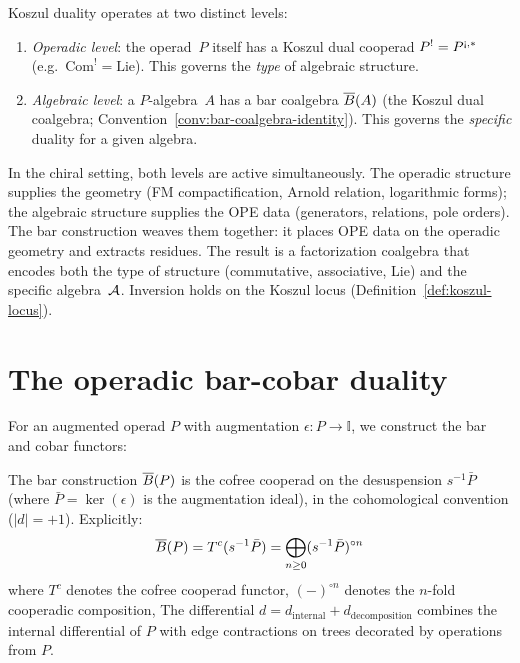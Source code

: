 \begin{remark}
\label{rem:operadic-vs-algebraic-kd}
Koszul duality operates at two distinct levels:
\begin{enumerate}[label=\textup{(\alph*)}]
\item \emph{Operadic level}: the operad~$P$ itself has a Koszul
  dual cooperad $P^! = P^{{\text{\textexclamdown}},*}$
  (e.g.\ $\mathrm{Com}^! = \mathrm{Lie}$).  This governs the
  \emph{type} of algebraic structure.
\item \emph{Algebraic level}: a $P$-algebra~$A$ has a bar
  coalgebra $\overline{B}(A)$ (the Koszul dual coalgebra;
  Convention~\ref{conv:bar-coalgebra-identity}).  This governs the
  \emph{specific} duality for a given algebra.
\end{enumerate}
In the chiral setting, both levels are active simultaneously.
The operadic structure supplies the geometry
(FM compactification, Arnold relation, logarithmic forms);
the algebraic structure supplies the OPE data (generators,
relations, pole orders).  The bar construction weaves them
together: it places OPE data on the operadic geometry and
extracts residues.  The result is a factorization coalgebra
that encodes both the type of structure (commutative,
associative, Lie) and the specific algebra~$\mathcal{A}$.
Inversion holds on the Koszul locus
(Definition~\ref{def:koszul-locus}).
\end{remark}

\section{The operadic bar-cobar duality}
 
For an augmented operad $P$ with augmentation $\epsilon : P \to \mathbb{I}$, we construct the bar and cobar functors:
 
\begin{definition}
The bar construction $\overline{B}(P)$ is the cofree cooperad on the desuspension $s^{-1}\bar{P}$ (where $\bar{P} = \ker(\epsilon)$ is the augmentation ideal), in the cohomological convention ($|d| = +1$).  Explicitly:
\[
\overline{B}(P) = T^c(s^{-1}\bar{P}) = \bigoplus_{n \geq 0} (s^{-1}\bar{P})^{\circ n}
\]
where $T^c$ denotes the cofree cooperad functor, $(-)^{\circ n}$ denotes the $n$-fold cooperadic composition,
The differential $d = d_{\mathrm{internal}} + d_{\mathrm{decomposition}}$ combines the internal differential of $P$ with edge contractions on trees decorated by operations from $P$.
\end{definition}

